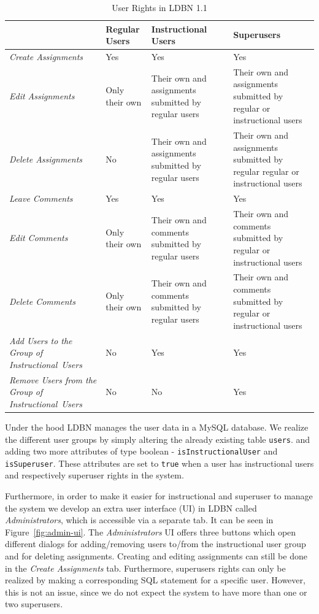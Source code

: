 \begin{center}
\begin{table}
\begin{tabular}[h]{| m{2.8cm} || m{2.2cm} | m{3.2cm} | m{3.3cm} |}
\hline
 & \textbf{Regular Users} & \textbf{Instructional Users} & \textbf{Superusers} \\
\hline
\hline
\emph{Create \mbox{Assignments}} & Yes & Yes & Yes \\
\hline
\emph{Edit \mbox{Assignments}}  & Only their own & Their own and assignments submitted by regular users & Their own and assignments submitted by regular or instructional users \\
\hline
\emph{Delete \mbox{Assignments}} & No & Their own and assignments submitted by regular users & Their own and assignments submitted by regular regular or instructional users \\
\hline
\emph{Leave \mbox{Comments}}    & Yes & Yes & Yes \\
\hline
\emph{Edit \mbox{Comments}}     & Only their own & Their own and comments submitted by regular users & Their own and comments submitted by regular or instructional users\\
\hline
\emph{Delete \mbox{Comments}}   & Only their own & Their own and comments submitted by regular users & Their own and comments submitted by regular or instructional users \\
\hline
\emph{Add Users to the Group of \mbox{Instructional Users}} & No & Yes & Yes \\
\hline
\emph{Remove Users from the Group of \mbox{Instructional Users}} & No & No & Yes \\
\hline
\end{tabular}
\caption{User Rights in LDBN 1.1}
\label{tab:user-rights}
\end{table}
\end{center}


Under the hood LDBN manages the user data in a MySQL database. 
We realize the different user groups by simply altering the already existing table \verb=users=. 
and adding two more attributes 
of type boolean - \verb=isInstructionalUser= and \verb=isSuperuser=. 
These attributes are set to \verb=true= when a user has instructional users and respectively superuser 
rights in the system. 

Furthermore, in order to make it easier for instructional and superuser to manage the system
we develop an extra user interface (UI) in LDBN called \emph{Administrators}, which is accessible via a
separate tab. It can be seen in Figure~\ref{fig:admin-ui}. 
The \emph{Administrators} UI offers three buttons which open 
different dialogs for adding/removing users to/from the instructional user group and for
deleting assignments. Creating and editing assignments can still be done in the 
\emph{Create Assignments} tab. Furthermore, superusers rights can only be realized by making
a corresponding SQL statement for a specific user. However, this is not an issue, since 
we do not expect the system to have more than one or two superusers. 

